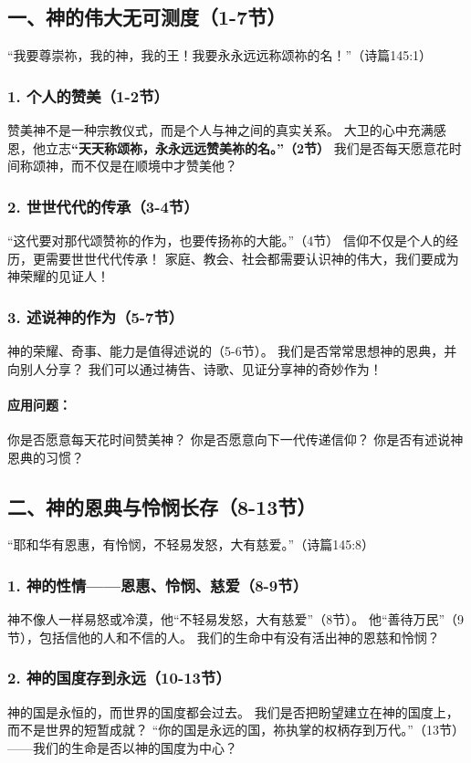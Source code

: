 \documentclass[a4paper, 12pt]{article}
\begin{document}
\subsection*{一、神的伟大无可测度（1-7节）}
“我要尊崇祢，我的神，我的王！我要永永远远称颂祢的名！”（诗篇145:1）

\subsubsection*{1. 个人的赞美（1-2节）}
赞美神不是一种宗教仪式，而是个人与神之间的真实关系。
大卫的心中充满感恩，他立志\textbf{“天天称颂祢，永永远远赞美祢的名。”（2节）}
我们是否每天愿意花时间称颂神，而不仅是在顺境中才赞美他？
\subsubsection*{2. 世世代代的传承（3-4节）}
“这代要对那代颂赞祢的作为，也要传扬祢的大能。”（4节）
信仰不仅是个人的经历，更需要世世代代传承！
家庭、教会、社会都需要认识神的伟大，我们要成为神荣耀的见证人！
\subsubsection*{3. 述说神的作为（5-7节）}
神的荣耀、奇事、能力是值得述说的（5-6节）。
我们是否常常思想神的恩典，并向别人分享？
我们可以通过祷告、诗歌、见证分享神的奇妙作为！
\paragraph*{应用问题：}
你是否愿意每天花时间赞美神？
你是否愿意向下一代传递信仰？
你是否有述说神恩典的习惯？
\subsection*{二、神的恩典与怜悯长存（8-13节）}
“耶和华有恩惠，有怜悯，不轻易发怒，大有慈爱。”（诗篇145:8）

\subsubsection*{1. 神的性情——恩惠、怜悯、慈爱（8-9节）}
神不像人一样易怒或冷漠，他“不轻易发怒，大有慈爱”（8节）。
他“善待万民”（9节），包括信他的人和不信的人。
我们的生命中有没有活出神的恩慈和怜悯？
\subsubsection*{2. 神的国度存到永远（10-13节）}
神的国是永恒的，而世界的国度都会过去。
我们是否把盼望建立在神的国度上，而不是世界的短暂成就？
“你的国是永远的国，祢执掌的权柄存到万代。”（13节）——我们的生命是否以神的国度为中心？
\end{document}
